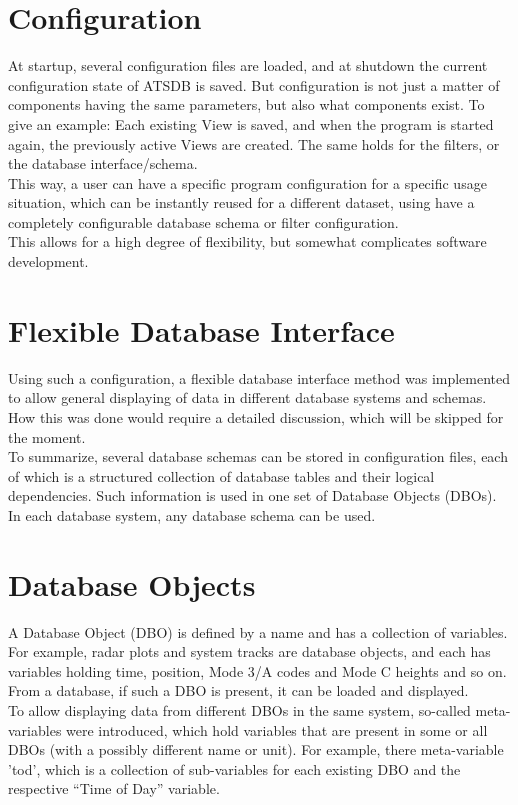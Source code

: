 \documentclass[10pt,letterpaper,extrafontsizes]{memoir}
\begin{document}
\section*{Configuration}
At startup, several configuration files are loaded, and at shutdown the current configuration state of ATSDB is saved.  But configuration is not just a matter of components having the same parameters, but also what components exist. To give an example: Each existing View is saved, and when the program is started again, the previously active Views are created.  The same holds for the filters, or the database interface/schema. \\
This way, a user can have a specific program configuration for a specific usage situation, which can be instantly reused for a different dataset, using have a completely configurable database schema or filter configuration. \\
This allows for a high degree of flexibility, but somewhat complicates software development.

\section*{Flexible Database Interface}
Using such a configuration, a flexible database interface method was implemented to allow general displaying of data in different database systems and schemas.  How this was done would require a detailed discussion, which will be skipped for the moment.\\
To summarize, several database schemas can be stored in configuration files, each of which is a structured collection of database tables and their logical dependencies. Such information is used in one set of Database Objects (DBOs). In each database system, any database schema can be used.

\section*{Database Objects}
A Database Object (DBO) is defined by a name and has a collection of variables. For example, radar plots and system tracks are database objects, and each has variables holding time, position, Mode 3/A codes and Mode C heights and so on. From a database, if such a DBO is present, it can be loaded and displayed.\\

To allow displaying data from different DBOs in the same system, so-called meta-variables were  introduced, which hold variables that are present in some or all DBOs (with a possibly different name or unit).  For example, there meta-variable 'tod', which is a collection of sub-variables for each existing DBO and the respective ``Time of Day'' variable.
\end{document}
